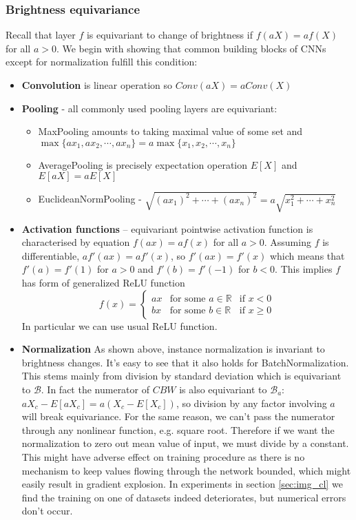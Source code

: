 \subsubsection{Brightness equivariance}
Recall that layer $f$ is equivariant to
change of brightness if $ f(aX) = af(X)$ for all $a>0$.
We begin with showing that common building blocks of CNNs except for
normalization fulfill this condition:
\begin{itemize}
    \item \textbf{Convolution} is linear operation so $\mathit{Conv}(aX) =
        a\mathit{Conv}(X)$
    \item \textbf{Pooling} - all commonly used pooling layers are equivariant:
        \begin{itemize}
            \item MaxPooling amounts to taking maximal value of some set and\\
                $\max\{ax_1,ax_2,\cdots,ax_n\}=a\max\{x_1,x_2,\cdots,x_n\}$
            \item AveragePooling is precisely expectation operation $E[X]$ and
                    $E[aX] = aE[X]$
            \item EuclideanNormPooling -
                $\sqrt{(ax_1)^2+\cdots+(ax_n)^2} = a\sqrt{x_1^2+\cdots+x_n^2}$
        \end{itemize}
    \item \textbf{Activation functions} -- equivariant pointwise activation
        function is characterised by equation $f(ax) = af(x)$ for all $a>0$.
        Assuming $f$ is differentiable, $af'(ax) = af'(x)$, so $f'(ax)=f'(x)$ which
        means that $f'(a)=f'(1)$ for $a>0$ and $f'(b)=f'(-1)$ for $b<0$.
        This implies $f$ has form of generalized ReLU function
        $$f(x)=\left\{
            \begin{array}{lll}
                ax & \mbox{for some } a \in \mathbb{R} & \mbox{if } x<0 \\
                bx & \mbox{for some } b \in \mathbb{R} & \mbox{if } x \geq 0
            \end{array}\right.$$
        In particular we can use usual ReLU function.
    \item \textbf{Normalization} As shown above, instance normalization is
        invariant to brightness changes. It's easy to see that it also holds
        for BatchNormalization. This stems mainly from division by
        standard deviation which is equivariant to $\mathcal{B}$. In fact
        the numerator of $\mathit{CBW}$ is also equivariant to $\mathcal{B}_a$:
        $aX_c-E[aX_c]=a(X_c-E[X_c])$, so division by any factor involving $a$
        will break equivariance. For the same reason, we can't pass the
        numerator through any nonlinear function, e.g. square root.
        Therefore if we want the normalization to zero
        out mean value of input, we must divide by a constant. This might have
        adverse effect on training procedure as there is no mechanism to keep
        values flowing through the network bounded, which might easily result in
        gradient explosion. In experiments in section \ref{sec:img_cl} we find
        the training on one of datasets indeed deteriorates, but numerical errors
        don't occur.
\end{itemize}
